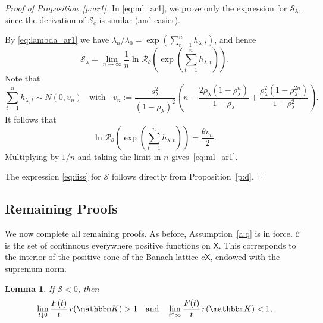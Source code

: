 \documentclass[12pt, reqno]{amsart}
\newcommand{\1}{\mathbbm 1}
\newcommand{\cC}{\mathscr C}
\newcommand{\rR}{\mathcal R}
\newcommand{\sS}{\mathscr S}
\newcommand{\KK}{\mathbbm K}
\newcommand{\XX}{\mathsf X}
\theoremstyle{plain}
\newtheorem{lemma}[theorem]{Lemma}
\theoremstyle{definition}
\begin{document}
\begin{proof}[Proof of Proposition~\ref{p:ar1}]
    In \eqref{eq:ml_ar1}, we prove only the expression for $\sS_\lambda$, 
    since the derivation of $\sS_c$ is similar (and easier).  

    By \eqref{eq:lambda_ar1} we have $\lambda_n / \lambda_0 =
    \exp\left(\sum_{t=1}^{n}h_{\lambda, t} \right)$, and hence
    \begin{equation*}
        \sS_\lambda = \lim_{n \to \infty}
        \frac{1}{n}
        \ln 
        \rR_\theta 
        \left(
        \exp\left(\sum_{t=1}^{n}h_{\lambda, t} \right)
        \right).
    \end{equation*}
    Note that
    \begin{equation*}
        \sum_{t=1}^{n} h_{\lambda, t}
        \sim N(0, v_n)
        \;\; \text{ with } \;\;
        v_n := 
        \frac{s_\lambda^2}{(1-\rho_\lambda)^2}
        \left(
        n -
        \frac{2\rho_\lambda (1-\rho_\lambda^n)}{1-\rho_\lambda}
        +\frac{\rho_\lambda^2(1-\rho_\lambda^{2n})}{1-\rho_\lambda^2}
        \right).
    \end{equation*}
    It follows that
    \begin{equation*}
        \ln \rR_\theta 
        \left(\exp\left(\sum_{t=1}^{n}h_{\lambda, t}\right)\right) 
        = \frac{\theta v_n}{2}.
    \end{equation*}
    Multiplying by $1/n$ and taking the limit in $n$ gives~\eqref{eq:ml_ar1}. 

    The expression \eqref{eq:iiss} for $\sS$ follows directly from
    Proposition~\ref{p:d}.
\end{proof}



\subsection{Remaining Proofs}

We now complete all remaining proofs.  As before, Assumption~\ref{a:q} is in
force.  $\cC$ is the set of continuous everywhere positive functions on $\XX$.
This corresponds to the interior of the positive cone of the Banach lattice $c
\XX$, endowed with the supremum norm.


\begin{lemma}
    \label{l:Ft}
    If $\sS < 0$, then 
    \begin{equation}\label{eq:cpk}
        \lim_{t \downarrow 0} \frac{F(t)}{t} \, r(\KK) > 1
        \quad \text{and} \quad
        \lim_{t \uparrow \infty} \frac{F(t)}{t} \, r(\KK) < 1,
    \end{equation}
\end{lemma}
\end{document}
